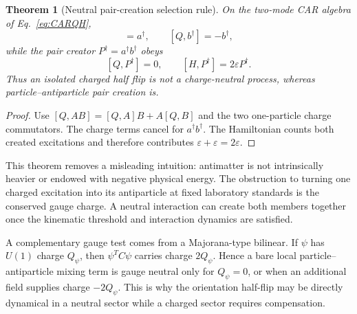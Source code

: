 \documentclass[11pt]{article}
\newtheorem{theorem}{Theorem}[section]
\theoremstyle{definition}\newtheorem{definition}[theorem]{Definition}
\theoremstyle{remark}\newtheorem{remark}[theorem]{Remark}\newtheorem{conjecture}[theorem]{Conjecture}
\begin{document}
\begin{theorem}[Neutral pair-creation selection rule]\label{thm:paircreation}
On the two-mode CAR algebra of Eq.~\eqref{eq:CARQH},
\begin{equation}
 [Q,a^\dagger]=a^\dagger,\qquad
 [Q,b^\dagger]=-b^\dagger,
\end{equation}
while the pair creator $P^\dagger=a^\dagger b^\dagger$ obeys
\begin{equation}\label{eq:paircommutators}
 \boxed{[Q,P^\dagger]=0,\qquad [H,P^\dagger]=2\varepsilon P^\dagger.}
\end{equation}
Thus an isolated charged half flip is not a charge-neutral process, whereas particle--antiparticle pair creation is.
\end{theorem}
\begin{proof}
Use $[Q,AB]=[Q,A]B+A[Q,B]$ and the two one-particle charge commutators. The charge terms cancel for $a^\dagger b^\dagger$. The Hamiltonian counts both created excitations and therefore contributes $\varepsilon+\varepsilon=2\varepsilon$.
\end{proof}

This theorem removes a misleading intuition: antimatter is not intrinsically heavier or endowed with negative physical energy. The obstruction to turning one charged excitation into its antiparticle at fixed laboratory standards is the conserved gauge charge. A neutral interaction can create both members together once the kinematic threshold and interaction dynamics are satisfied.

A complementary gauge test comes from a Majorana-type bilinear. If $\psi$ has $U(1)$ charge $Q_\psi$, then $\psi^T C\psi$ carries charge $2Q_\psi$. Hence a bare local particle--antiparticle mixing term is gauge neutral only for $Q_\psi=0$, or when an additional field supplies charge $-2Q_\psi$. This is why the orientation half-flip may be directly dynamical in a neutral sector while a charged sector requires compensation.
\end{document}
